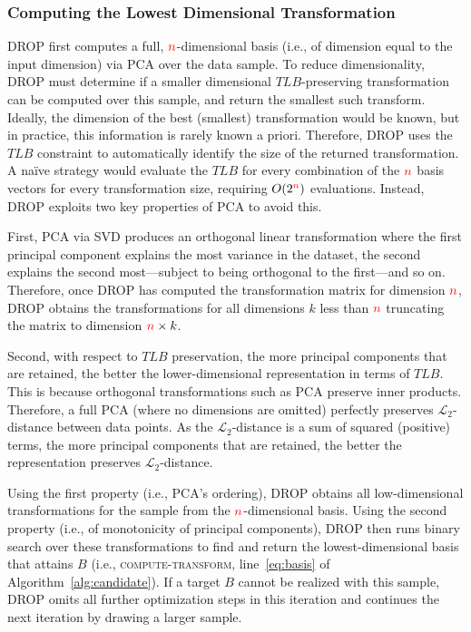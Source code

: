 \subsubsection{Computing the Lowest Dimensional Transformation}


DROP first computes a full, ${\color{red}n}$-dimensional basis (i.e., of dimension equal to the input dimension) via PCA over the data sample.
To reduce dimensionality, DROP must determine if a smaller dimensional $TLB$-preserving transformation can be computed over this sample, and return the smallest such transform. 
Ideally, the dimension of the best (smallest) transformation would be known, but in practice, this information is rarely known a priori.   
Therefore, DROP uses the $TLB$ constraint to automatically identify the size of the returned transformation.
A na\"ive strategy would evaluate the $TLB$ for every combination of the ${\color{red}n}$ basis vectors for every transformation size, requiring $O(2^{\color{red}n})$ evaluations. 
Instead, DROP exploits two key properties of PCA to avoid this.

First, PCA via SVD produces an orthogonal linear transformation where the first principal component explains the most variance in the dataset, the second explains the second most---subject to being orthogonal to the first---and so on.  
Therefore, once DROP has computed the transformation matrix for dimension ${\color{red}n}$, DROP obtains the transformations for all dimensions $k$ less than ${\color{red}n}$ truncating the matrix to dimension ${\color{red}n} \times k$.

Second, with respect to $TLB$ preservation, the more principal components that are retained, the better the lower-dimensional representation in terms of $TLB$.  
This is because orthogonal transformations such as PCA preserve inner products. 
Therefore, a full PCA (where no dimensions are omitted) perfectly preserves $\mathcal{L}_2$-distance between data points. 
As the $\mathcal{L}_2$-distance is a sum of squared (positive) terms, the more principal components that are retained, the better the representation preserves $\mathcal{L}_2$-distance.

Using the first property (i.e., PCA's ordering), DROP obtains all low-dimensional transformations for the sample from the ${\color{red}n}$-dimensional basis.  
Using the second property (i.e., of monotonicity of principal components), DROP then runs binary search over these transformations to find and return the lowest-dimensional basis that attains $B$ (i.e., \textsc{compute-transform}, line~\ref{eq:basis} of Algorithm~\ref{alg:candidate}).
If a target $B$ cannot be realized with this sample, DROP omits all further optimization steps in this iteration and continues the next iteration by drawing a larger sample.

